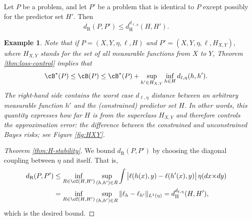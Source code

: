 \documentclass[twoside,11pt]{article}
\newtheorem{examples}[theorem]{Example}
\newcommand{\dexp}[1][]{d_{\mathrm{R}#1}}
\newcommand{\dH}{d_\mathrm{H}}
\begin{document}
    
    \begin{theorem}\label{thm:H-stability}
        Let $P$ be a problem, and let $P'$ be a problem that is identical to $P$ except possibly for the predictor set $H'$. Then
        \begin{equation*}
            \dexp(P,P') \leq \dH^{d_{\ell,\eta}}\left(H,H'\right).
        \end{equation*}
    \end{theorem}

    
    \begin{examples}\label{ex:HXY}
    Note that if $P=(X,Y,\eta,\ell,H)$ and $P'=(X,Y,\eta,\ell,H_{X,Y})$, where $H_{X,Y}$ stands for the set of all measurable functions from $X$ to $Y$,  Theorem \ref{thm:loss-control} implies that $$\cB^*(P)\leq \cB(P)\leq \cB^*(P)+\sup_{h'\in H_{X,Y}}\inf_{h\in H} d_{\ell,\eta}(h,h').$$
    The right-hand side contains the worst case $d_{\ell,\eta}$ distance between an arbitrary measurable  function $h'$ and the (constrained) predictor set $H$. In other words, this quantity expresses how far  $H$ is from the superclass $H_{X,Y}$ and therefore controls the \emph{approximation error}: the difference between the constrained and unconstrained Bayes risks; see Figure \ref{fig:HXY}.
    \end{examples}


    
    \begin{proof}[Theorem \ref{thm:H-stability}]
        We bound $\dexp(P,P')$ by choosing the diagonal coupling between $\eta$ and itself. That is,
        \begin{align*}
            \dexp(P,P') & \leq \inf_{R\in \cC(H,H')} \sup_{(h,h')\in R} \int \big| \ell(h(x),y) - \ell(h'(x),y)\big | \, \eta(dx{\times} dy)
            \\ &
            = \inf_{R\in \cC(H,H')} \sup_{(h,h')\in R} \| \ell_h - \ell_{h'}\|_{L^1(\eta)} = \dH^{d_{\ell,\eta}}(H,H'), %
        \end{align*}
        which is the desired bound.
    \end{proof}
\end{document}
